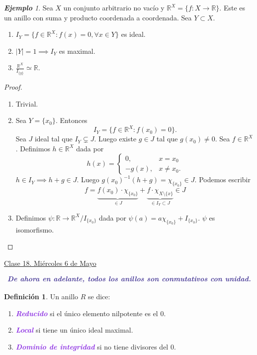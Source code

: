 \documentclass{article}
\theoremstyle{definition}
\newtheorem{definition}[theorem]{Definición}
\theoremstyle{remark}
\newtheorem{example}[theorem]{\textbf{Ejemplo}}
\numberwithin{equation}{section}
\newcommand{\R}{\mathbb{R}}
\renewcommand{\c}{\cdot}
\newcommand{\abs}[1]{\left| #1 \right|}
\newcommand{\ds}{\displaystyle}
\newcommand{\wea}[1]{\textcolor{BlueViolet}{\textbf{\emph{#1}}}}
\newcommand{\fecha}[1]{\begin{flushright} \underline{#1} \end{flushright}}
\begin{document}
\begin{example}
  Sea $X$ un conjunto arbitrario no vacío y $\R^X = \{f \colon X \to \R\}$. Este es un anillo con suma y producto coordenada a coordenada.
  Sea $Y \subset X$. 
  \begin{enumerate}[(1)]
    \item $I_Y = \{f \in \R^X \colon f(x) = 0, \forall x \in Y\}$ es ideal.
    \item $\abs Y = 1 \implies I_Y$ es maximal.
    \item $\ds \frac{\R^X}{I_{\{y\}}} \simeq \R$.
  \end{enumerate}
\end{example}
\begin{proof}
  \ 
  \begin{enumerate}[(1)]
    \item Trivial.
    \item Sea $Y = \{x_0\}$. Entonces 
    \[ I_Y = \{f \in \R^X \colon f(x_0) = 0\}. \]
    Sea $J$ ideal tal que $I_Y \subsetneq J$. Luego existe $g \in J$ tal que $g(x_0) \neq 0$. Sea $f \in \R^X$. Definimos $h \in \R^X$ dada por 
    \[ h(x) = \begin{cases}
      0, &x = x_0 \\
      -g(x), &x \neq x_0.
    \end{cases} \]
    $h \in I_Y \implies h+g \in J$. Luego $g(x_0)^{-1}(h+g) = \chi_{\{x_0\}} \in J$. Podemos escribir 
    \[ f = \underbrace{f(x_0) \c \chi_{\{x_0\}}}_{\in J} + \underbrace{f \c \chi_{X \setminus \{x\}}}_{\in I_Y \subset J} \in J \]

    \item Definimos $\psi \colon \R \to \R^X/I_{\{x_0\}}$ dada por $\psi(a) = a \chi_{\{x_0\}} + I_{\{x_0\}}$. $\psi$ es isomorfismo. %
  \end{enumerate}
\end{proof}

\fecha{Clase 18. Miércoles 6 de Mayo}


\[ \wea{De ahora en adelante, todos los anillos son conmutativos con unidad.} \]

\begin{definition}
  Un anillo $R$ se dice: 
  \begin{enumerate}[(1)]
    \item \wea{Reducido} si el único elemento nilpotente es el 0.
    \item \wea{Local} si tiene un único ideal maximal.
    \item \wea{Dominio de integridad} si no tiene divisores del 0.
  \end{enumerate}
\end{definition}
\end{document}

